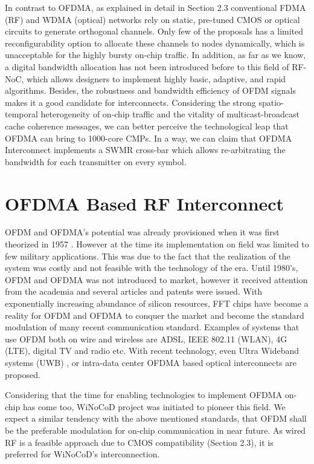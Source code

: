 In contrast to OFDMA, as explained in detail in Section 2.3 conventional FDMA (RF) and WDMA (optical) networks rely on static, pre-tuned CMOS or optical circuits to generate orthogonal channels. Only few of the proposals has a limited reconfigurability option to allocate these channels to nodes dynamically, which is unacceptable for the highly bursty on-chip traffic. In addition, as far as we know, a digital bandwidth allocation has not been introduced before to this field of RF-NoC, which allows designers to implement highly basic, adaptive, and rapid algorithms. Besides, the robustness and bandwidth efficiency of OFDM signals makes it a good candidate for interconnects. Considering the strong spatio-temporal heterogeneity of on-chip traffic and the vitality of multicast-broadcast cache coherence messages, we can better perceive the technological leap that OFDMA can bring to 1000-core CMPs. In a way, we can claim that OFDMA Interconnect implements a SWMR cross-bar which allows re-arbitrating the bandwidth for each transmitter on every symbol.  

\section{OFDMA Based RF Interconnect}

OFDM and OFDMA's potential was already provisioned when it was first theorized in 1957 \cite{mosier1958kineplex}. However at the time its implementation on field was limited to few military applications. This was due to the fact that the realization of the system was costly and not feasible with the technology of the era. Until 1980's, OFDM and OFDMA was not introduced to market, however it received attention from the academia and several articles and patents were issued. With exponentially increasing abundance of silicon resources, FFT chips have become a reality for OFDM and OFDMA to conquer the market and become the standard modulation of many recent communication standard. Examples of systems that use OFDM both on wire and wireless are ADSL, IEEE 802.11 (WLAN), 4G (LTE), digital TV and radio etc. With recent technology, even Ultra Wideband systems (UWB) \cite{saberinia2003pulsed}, or intra-data center OFDMA based optical interconnects \cite{ji2013first} are proposed.   


Considering that the time for enabling technologies to implement OFDMA on-chip has come too, WiNoCoD project was initiated to pioneer this field. We expect a similar tendency with the above mentioned standards, that OFDM shall be the preferable modulation for on-chip communication in near future. As wired RF is a feasible approach due to CMOS compatibility (Section 2.3), it is preferred for WiNoCoD's interconnection.

